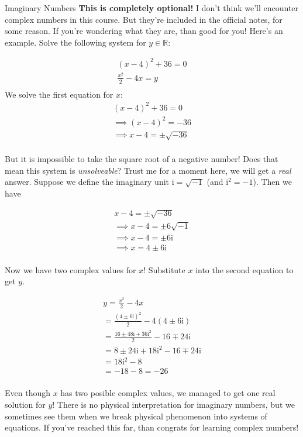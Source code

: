 \begin{boxremark*}{Imaginary Numbers}{}
	{\bf This is completely optional!} I don't think we'll encounter complex numbers in this course. But they're included in the official notes, for some reason. If you're wondering what they are, than good for you! Here's an example. Solve the following system for $y \in \mathbb{R}$:

	\begin{align*}
		(x-4)^2+36=0\\
		\frac{x^2}{2}-4x=y\\
	\end{align*}
	We solve the first equation for $x$:
	\begin{align*}
		(x-4)^2+36=0\\
		\implies (x-4)^2=-36\\
		\implies x-4=\pm\sqrt{-36}\\
	\end{align*}

	But it is impossible to take the square root of a negative number! Does that mean this system is \emph{unsolveable}? Trust me for a moment here, we will get a \emph{real} answer. Suppose we define the imaginary unit $\mathrm{i} = \sqrt{-1}$ (and $\mathrm{i}^2=-1$). Then we have

	\begin{align*}
		x-4=\pm\sqrt{-36}\\
		\implies x-4=\pm6\sqrt{-1}\\
		\implies x-4=\pm6\mathrm{i}\\
		\implies x=4\pm6\mathrm{i}\\
	\end{align*}

	Now we have two complex values for $x$! Substitute $x$ into the second equation to get $y$.

	\begin{align*}
		y=\frac{x^2}{2}-4x\\
		=\frac{(4\pm6\mathrm{i})^2}{2}-4(4\pm6\mathrm{i})\\
		=\frac{16\pm48\mathrm{i}+36\mathrm{i}^2}{2}-16\mp24\mathrm{i}\\
		=8\pm24\mathrm{i}+18\mathrm{i}^2-16\mp24\mathrm{i}\\
		=18\mathrm{i}^2-8\\
		=-18-8=-26\\
	\end{align*}

	Even though $x$ has two posible complex values, we managed to get one real solution for $y$! There is no physical interpretation for imaginary numbers, but we sometimes see them when we break physical phenomenon into systems of equations. If you've reached this far, than congrats for learning complex numbers!
\end{boxremark*}

